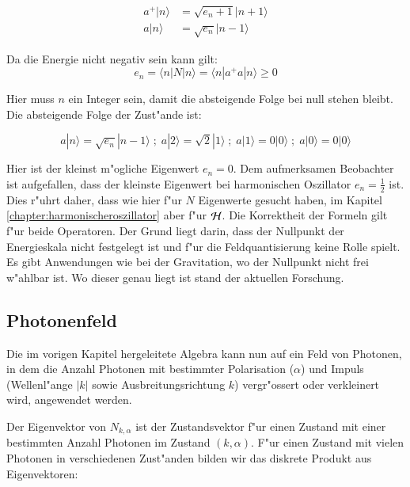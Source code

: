 \begin{equation}
\begin{split}
a^+|n\rangle &= \sqrt{e_n+1}|n+1\rangle \\
a|n\rangle &= \sqrt{e_n}|n-1\rangle
\end{split}
\end{equation}

Da die Energie nicht negativ sein kann gilt:
\begin{equation}
e_n = \langle n | N |n \rangle = \langle n | a^+a |n \rangle \geq 0
\end{equation}

Hier muss $n$ ein Integer sein, damit die absteigende Folge bei null stehen bleibt. Die absteigende Folge der Zust"ande ist:

\begin{equation}
a|n\rangle = \sqrt{e_n}|n-1\rangle \; ; \; a|2\rangle = \sqrt{2}|1\rangle \; ; \; a|1\rangle = 0|0\rangle \; ; \; a|0\rangle = 0|0\rangle
\end{equation}

Hier ist der kleinst m"ogliche Eigenwert $e_n = 0$. Dem aufmerksamen Beobachter ist aufgefallen, dass der kleinste Eigenwert bei harmonischen Oszillator $e_n = \frac{1}{2}$ ist. Dies r"uhrt daher, dass wie hier f"ur $N$ Eigenwerte gesucht haben, im Kapitel \ref{chapter:harmonischeroszillator} aber f"ur ${\cal H}$. Die Korrektheit der Formeln gilt f"ur beide Operatoren. Der Grund liegt darin, dass der Nullpunkt der Energieskala nicht festgelegt ist und f"ur die Feldquantisierung keine Rolle spielt. Es gibt Anwendungen wie bei der Gravitation, wo der Nullpunkt nicht frei w"ahlbar ist. Wo dieser genau liegt ist stand der aktuellen Forschung.

\subsection{Photonenfeld}

Die im vorigen Kapitel hergeleitete Algebra kann nun auf ein Feld von Photonen, in dem die Anzahl Photonen mit bestimmter Polarisation ($\alpha$) und Impuls (Wellenl"ange $|k|$ sowie Ausbreitungsrichtung $k$) vergr"ossert oder verkleinert wird, angewendet werden.

Der Eigenvektor von $N_{k,\alpha}$ ist der Zustandsvektor f"ur einen Zustand mit einer bestimmten Anzahl Photonen im Zustand $(k,\alpha)$. F"ur einen Zustand mit vielen Photonen in verschiedenen Zust"anden bilden wir das diskrete Produkt aus Eigenvektoren:

